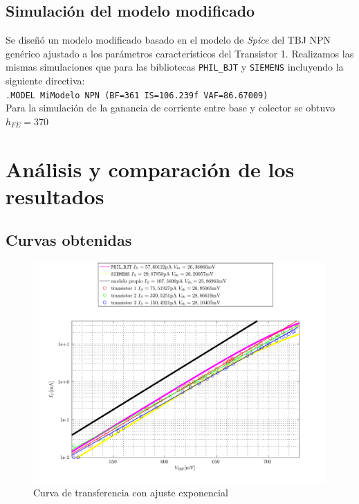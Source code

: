 \documentclass[10pt,spanish,a4paper,openany,notitlepage]{article}
\begin{document}
\subsection{Simulación del modelo modificado}

Se diseñó un modelo modificado basado en el modelo de \emph{Spice} del 
TBJ NPN genérico ajustado a los parámetros característicos del Transistor 1. 
Realizamos las mismas simulaciones que para las bibliotecas \texttt{PHIL\_BJT} 
y \texttt{SIEMENS} incluyendo la siguiente directiva:\\

\texttt{.MODEL MiModelo NPN (BF=361 IS=106.239f VAF=86.67009)}\\

Para la simulación de la ganancia de corriente entre base y colector se obtuvo $h_{FE} = 370$

\section{Análisis y comparación de los resultados}

\subsection{Curvas obtenidas}

\begin{figure}[H] %
\begin{center}
\includegraphics[scale=0.7]{./Octave/IdvsVbe_exp.pdf}
\caption{Curva de transferencia con ajuste exponencial}
 \label{fig:transferencia_exp}
\end{center}
\end{figure}
\end{document}
